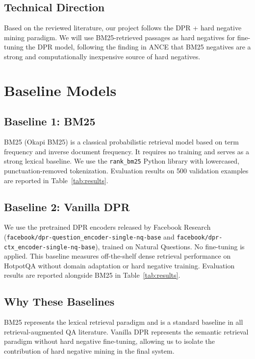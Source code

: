 \documentclass[12pt,a4paper]{article}
\begin{document}
\subsection*{Technical Direction}

Based on the reviewed literature, our project follows the DPR + hard negative mining
paradigm. We will use BM25-retrieved passages as hard negatives for fine-tuning the
DPR model, following the finding in ANCE that BM25 negatives are a strong and
computationally inexpensive source of hard negatives.

\section{Baseline Models}

\subsection*{Baseline 1: BM25}

BM25 (Okapi BM25) is a classical probabilistic retrieval model based on term frequency
and inverse document frequency. It requires no training and serves as a strong lexical
baseline. We use the \texttt{rank\_bm25} Python library with lowercased,
punctuation-removed tokenization. Evaluation results on 500 validation examples are
reported in Table~\ref{tab:results}.

\subsection*{Baseline 2: Vanilla DPR}

We use the pretrained DPR encoders released by Facebook Research
(\texttt{facebook/dpr-question\_encoder-single-nq-base} and
\texttt{facebook/dpr-ctx\_encoder-single-nq-base}), trained on Natural Questions.
No fine-tuning is applied. This baseline measures off-the-shelf dense retrieval
performance on HotpotQA without domain adaptation or hard negative training.
Evaluation results are reported alongside BM25 in Table~\ref{tab:results}.

\subsection*{Why These Baselines}

BM25 represents the lexical retrieval paradigm and is a standard baseline in all
retrieval-augmented QA literature. Vanilla DPR represents the semantic retrieval
paradigm without hard negative fine-tuning, allowing us to isolate the contribution
of hard negative mining in the final system.
\end{document}

